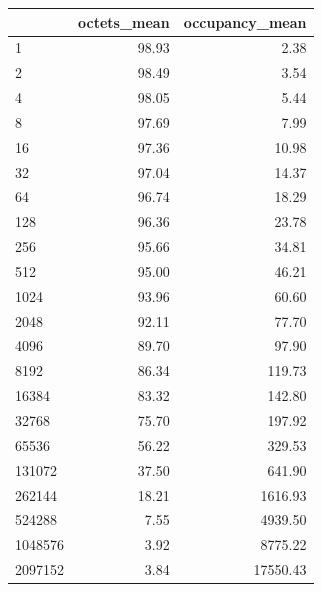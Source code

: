 \begin{tabular}{lrr}
\toprule
 & octets_mean & occupancy_mean \\
\midrule
1 & 98.93 & 2.38 \\
2 & 98.49 & 3.54 \\
4 & 98.05 & 5.44 \\
8 & 97.69 & 7.99 \\
16 & 97.36 & 10.98 \\
32 & 97.04 & 14.37 \\
64 & 96.74 & 18.29 \\
128 & 96.36 & 23.78 \\
256 & 95.66 & 34.81 \\
512 & 95.00 & 46.21 \\
1024 & 93.96 & 60.60 \\
2048 & 92.11 & 77.70 \\
4096 & 89.70 & 97.90 \\
8192 & 86.34 & 119.73 \\
16384 & 83.32 & 142.80 \\
32768 & 75.70 & 197.92 \\
65536 & 56.22 & 329.53 \\
131072 & 37.50 & 641.90 \\
262144 & 18.21 & 1616.93 \\
524288 & 7.55 & 4939.50 \\
1048576 & 3.92 & 8775.22 \\
2097152 & 3.84 & 17550.43 \\
\bottomrule
\end{tabular}
